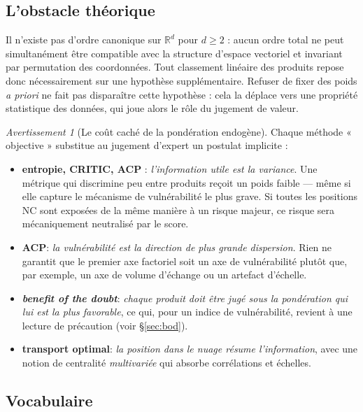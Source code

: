 \documentclass[11pt,a4paper]{article}
\theoremstyle{definition}
\theoremstyle{remark}
\newtheorem{avertissement}{Avertissement}[section]
\newcommand{\R}{\mathbb{R}}
\begin{document}
\bigskip

\subsection{L'obstacle théorique}

\medskip

Il n'existe pas d'ordre canonique sur $\R^d$ pour $d \ge 2$ : aucun ordre total ne peut
simultanément être compatible avec la structure d'espace vectoriel et invariant par permutation
des coordonnées. Tout classement linéaire des produits repose donc nécessairement sur une
hypothèse supplémentaire. Refuser de fixer des poids \emph{a priori} ne fait pas disparaître cette
hypothèse : cela la déplace vers une propriété statistique des données, qui joue alors le rôle du
jugement de valeur.

\medskip

\begin{avertissement}[Le coût caché de la pondération endogène]
  \label{av:cout}
  Chaque méthode « objective » substitue au jugement d'expert un postulat implicite :
  \begin{itemize}[nosep,leftmargin=1.4em]
    \item \textbf{entropie, CRITIC, ACP} : \emph{l'information utile est la variance}. Une métrique
    qui discrimine peu entre produits reçoit un poids faible --- même si elle capture le mécanisme
    de vulnérabilité le plus grave. Si toutes les positions NC sont exposées de la même manière à un
    risque majeur, ce risque sera mécaniquement neutralisé par le score.
    \item \textbf{ACP}: \emph{la vulnérabilité est la direction de plus grande dispersion}. Rien ne
    garantit que le premier axe factoriel soit un axe de vulnérabilité plutôt que, par exemple, un
    axe de volume d'échange ou un artefact d'échelle.
    \item \textbf{\emph{benefit of the doubt}}: \emph{chaque produit doit être jugé sous la
    pondération qui lui est la plus favorable}, ce qui, pour un indice de vulnérabilité, revient à
    une lecture de précaution (voir §\ref{sec:bod}).
    \item \textbf{transport optimal}: \emph{la position dans le nuage résume l'information}, avec
    une notion de centralité \emph{multivariée} qui absorbe corrélations et échelles.
  \end{itemize}
\end{avertissement}

\subsection{Vocabulaire}
\end{document}
